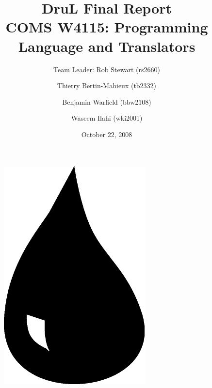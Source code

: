 \documentclass[11pt,twoside]{report}
\title{\textbf{DruL} Final Report \\
\vspace{1cm}
COMS W4115: Programming Language and Translators}
\author{Team Leader: Rob Stewart (rs2660) \and Thierry Bertin-Mahieux (tb2332) \and Benjamin Warfield (bbw2108) \and Waseem Ilahi (wki2001)\\
\date{October 22, 2008}}
\begin{document}
\maketitle
\begin{center}
\end{center}

\vspace{3cm}

\begin{figure}[h]
\begin{center}
\includegraphics[width=.2\columnwidth]{Water_Drop.pdf}
\end{center}
\end{figure}

\newpage

\setcounter{tocdepth}{2} 
\tableofcontents


\newpage



\newpage




\newpage 



\newpage


\end{document}
